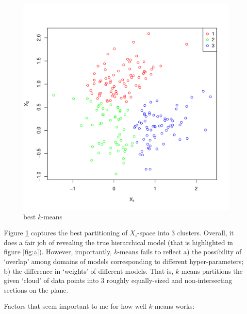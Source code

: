 \documentclass[a4paper,12pt,twoside]{article}
\begin{document}
\begin{figure}[ht]
\begin{minipage}[t]{0.45\linewidth}
\includegraphics[width = \textwidth, keepaspectratio]{best_k_means.pdf}
                        \caption{best $k$-means}
            \label{fig:b}
        \end{minipage}
\end{figure}

Figure \ref{fig:b} captures the best partitioning of $X_i$-space into 3
clusters. Overall, it does a fair job of revealing the true hierarchical model
(that is highlighted in figure \ref{fig:a}). However, importantly,  $k$-means
fails to reflect a) the possibility of `overlap' among domains of models
corresponding to different hyper-parameters; b) the difference in `weights' of
different models. That is, $k$-means partitions the given `cloud' of data
points into $3$ roughly equally-sized and non-intersecting sections on the
plane.

Factors that seem important to me for how well $k$-means works:
\end{document}
